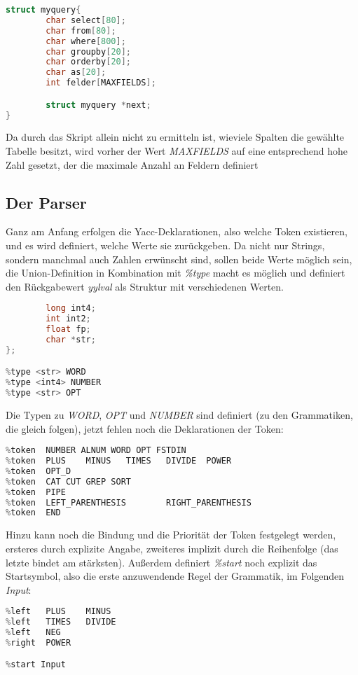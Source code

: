 \begin{lstlisting}[language=C]
struct myquery{
        char select[80];
        char from[80];
        char where[800];
        char groupby[20];
        char orderby[20];
        char as[20];
        int felder[MAXFIELDS];

        struct myquery *next;
}
\end{lstlisting}
Da durch das Skript allein nicht zu ermitteln ist, wieviele Spalten die gewählte Tabelle besitzt, wird vorher der Wert \textit{MAXFIELDS} auf eine entsprechend hohe Zahl gesetzt, der die maximale Anzahl an Feldern definiert

\subsection{Der Parser}
Ganz am Anfang erfolgen die Yacc-Deklarationen, also welche Token existieren, und es wird definiert, welche Werte sie zurückgeben. Da nicht nur Strings, sondern manchmal auch Zahlen erwünscht sind, sollen beide Werte möglich sein, die Union-Definition in Kombination mit \textit{\%type} macht es möglich und definiert den Rückgabewert \textit{yylval} als Struktur mit verschiedenen Werten.

\begin{lstlisting}[language=C]
%union {
        long int4;
        int int2;
        float fp; 
        char *str;
};

%type <str> WORD
%type <int4> NUMBER
%type <str> OPT
\end{lstlisting}

Die Typen zu \textit{WORD}, \textit{OPT} und \textit{NUMBER} sind definiert (zu den Grammatiken, die gleich folgen), jetzt fehlen noch die Deklarationen der Token:

\begin{lstlisting}[language=C]
%token  REDIR;
%token  NUMBER ALNUM WORD OPT FSTDIN
%token  PLUS    MINUS   TIMES   DIVIDE  POWER
%token  OPT_D
%token  CAT CUT GREP SORT
%token  PIPE
%token  LEFT_PARENTHESIS        RIGHT_PARENTHESIS
%token  END
\end{lstlisting}

Hinzu kann noch die Bindung und die Priorität der Token festgelegt werden, ersteres durch explizite Angabe, zweiteres implizit durch die Reihenfolge (das letzte bindet am stärksten). Außerdem definiert \textit{\%start} noch explizit das Startsymbol, also die erste anzuwendende Regel der Grammatik, im Folgenden \textit{Input}:

\begin{lstlisting}[language=C]
%left  PIPE
%left   PLUS    MINUS
%left   TIMES   DIVIDE
%left   NEG
%right  POWER

%start Input
\end{lstlisting}

